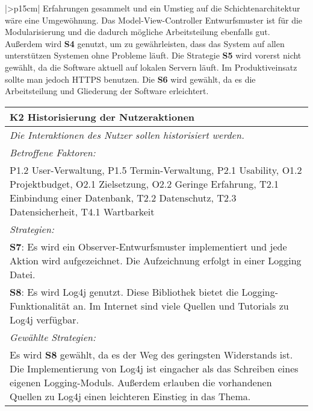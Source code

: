 {\begin{center}
\begin{minipage}{\linewidth}
\begin{tabular}{|>{\centering\arraybackslash}p{15cm}|}
Erfahrungen gesammelt und ein Umstieg auf die Schichtenarchitektur wäre eine Umgewöhnung. Das Model-View-Controller Entwurfsmuster ist für die Modularisierung und die dadurch mögliche Arbeitsteilung ebenfalls gut. Außerdem wird \textbf{S4} genutzt, um zu gewährleisten, dass das System auf allen unterstützen Systemen ohne Probleme läuft.
Die Strategie \textbf{S5} wird vorerst nicht gewählt, da die Software aktuell auf lokalen Servern läuft. Im Produktiveinsatz sollte man jedoch HTTPS benutzen.  Die \textbf{S6} wird gewählt, da es die Arbeitsteilung und Gliederung der Software erleichtert.
\\ \hline
        \end{tabular}
\end{minipage}
\end{center}

\begin{center}
\begin{minipage}{\linewidth}
    \centering
\renewcommand{\arraystretch}{1.5}
\begin{tabular}{|>{\centering\arraybackslash}p{15cm}|}
            \hline
           \textbf{K2 Historisierung der Nutzeraktionen}\\ \hline
            \label{K2}
            \textit{Die Interaktionen des Nutzer sollen historisiert werden.}\\ \hline
            \textit{Betroffene Faktoren:} \\ 
	P1.2 User-Verwaltung, P1.5 Termin-Verwaltung, P2.1 Usability, O1.2 Projektbudget, O2.1 Zielsetzung, O2.2 Geringe Erfahrung, T2.1 Einbindung einer Datenbank, T2.2 Datenschutz, T2.3 Datensicherheit, T4.1 Wartbarkeit
	\\ \hline
	      \textit{Strategien:} \\
	\textbf{S7}: Es wird ein Observer-Entwurfsmuster implementiert und jede Aktion wird aufgezeichnet. Die Aufzeichnung erfolgt in einer Logging Datei.\\
	\textbf{S8}: Es wird Log4j genutzt. Diese Bibliothek bietet die Logging-Funktionalität an. Im Internet sind viele Quellen und Tutorials zu Log4j verfügbar.
\\ \hline
	      \textit{Gewählte Strategien:} \\
Es wird \textbf{S8} gewählt, da es der Weg des geringsten Widerstands ist. Die Implementierung von Log4j ist eingacher als das Schreiben eines eigenen Logging-Moduls. Außerdem erlauben die vorhandenen Quellen zu Log4j einen leichteren Einstieg in das Thema.
 \\ \hline
        \end{tabular}
\end{minipage}
\end{center}



}
